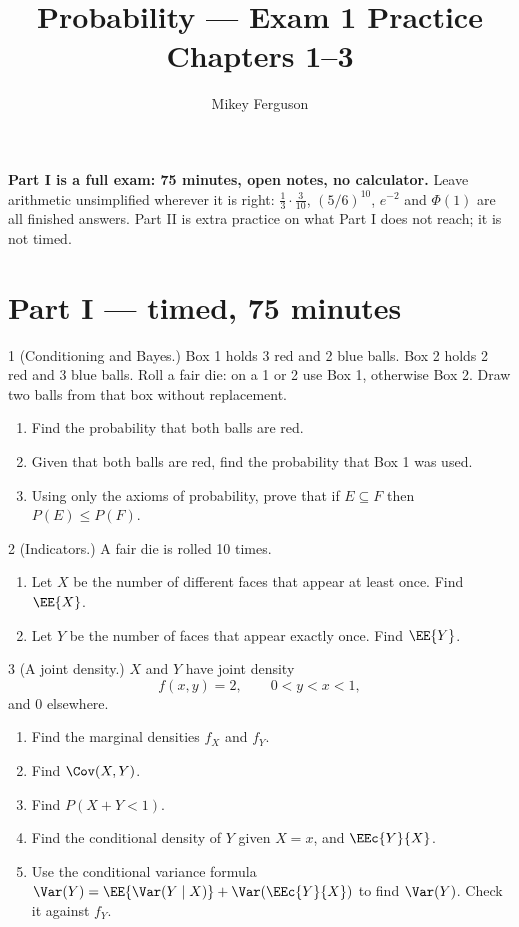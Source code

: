 \documentclass[11pt]{article}
\title{Probability --- Exam 1 Practice\\[2pt]\large Chapters 1--3}
\author{Mikey Ferguson}
\date{}
\begin{document}
\maketitle

\noindent\textbf{Part I is a full exam: 75 minutes, open notes, no calculator.}
Leave arithmetic unsimplified wherever it is right: $\tfrac{1}{3}\cdot\tfrac{3}{10}$,
$(5/6)^{10}$, $e^{-2}$ and $\Phi(1)$ are all finished answers. Part II is extra
practice on what Part I does not reach; it is not timed.

\section*{Part I --- timed, 75 minutes}

\begin{problem}{1}
  (Conditioning and Bayes.) Box 1 holds 3 red and 2 blue balls. Box 2 holds 2 red
  and 3 blue balls. Roll a fair die: on a 1 or 2 use Box 1, otherwise Box 2. Draw
  two balls from that box without replacement.
  \begin{enumerate}
    \item[(a)] Find the probability that both balls are red.
    \item[(b)] Given that both balls are red, find the probability that Box 1 was used.
    \item[(c)] Using only the axioms of probability, prove that if $E \subseteq F$ then
      $P(E) \le P(F)$.
  \end{enumerate}
\end{problem}
\vfill\newpage

\begin{problem}{2}
  (Indicators.) A fair die is rolled 10 times.
  \begin{enumerate}
    \item[(a)] Let $X$ be the number of different faces that appear at least once.
      Find $\EE{X}$.
    \item[(b)] Let $Y$ be the number of faces that appear exactly once. Find $\EE{Y}$.
  \end{enumerate}
\end{problem}
\vfill\newpage

\begin{problem}{3}
  (A joint density.) $X$ and $Y$ have joint density
  \[
    f(x,y) = 2, \qquad 0 < y < x < 1,
  \]
  and $0$ elsewhere.
  \begin{enumerate}
    \item[(a)] Find the marginal densities $f_X$ and $f_Y$.
    \item[(b)] Find $\Cov(X,Y)$.
    \item[(c)] Find $P(X + Y < 1)$.
    \item[(d)] Find the conditional density of $Y$ given $X = x$, and $\EEc{Y}{X}$.
    \item[(e)] Use the conditional variance formula
      $\Var(Y) = \EE{\Var(Y \mid X)} + \Var\!\left(\EEc{Y}{X}\right)$ to find
      $\Var(Y)$. Check it against $f_Y$.
  \end{enumerate}
\end{problem}
\vfill\newpage
\end{document}
